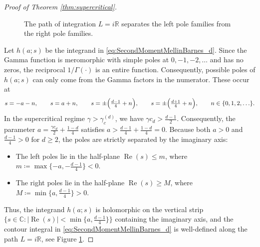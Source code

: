 \documentclass[11pt,a4paper]{article}
\theoremstyle{plain}
\theoremstyle{definition}
\theoremstyle{remark}
\def\CC{\mathbb{C}}
\def\RR{\mathbb{R}}
\begin{document}
\begin{proof}[Proof of Theorem \ref{thm:supercritical}]
\begin{figure}[t]
    \caption{The path of integration $L = i\RR$ separates the left pole families from the right pole families.}
    \label{fig:ContourGFunction}
\end{figure}

Let $h(a;s)$ be the integrand in \eqref{eq:SecondMomentMellinBarnes_d}. Since the Gamma function is meromorphic with simple poles at $0,-1,-2,\ldots$ and has no zeros, the reciprocal $1/\Gamma(\cdot)$ is an entire function. Consequently, possible poles of $h(a;s)$ can only come from the Gamma factors in the numerator. These occur at
\[
s=-a-n,\qquad s=a+n,\qquad s=\pm\Bigl(\tfrac{d-1}{4}+n\Bigr),\qquad s=\pm\Bigl(\tfrac{d+1}{4}+n\Bigr),
\qquad n\in\{0,1,2,\ldots\}.
\]
In the supercritical regime $\gamma>\gamma_c^{(d)}$, we have $\gamma c_d > \frac{d-1}{2}$. Consequently, the parameter $a = \frac{\gamma c_d}{2} + \frac{1-d}{4}$ satisfies $a > \frac{d-1}{4} + \frac{1-d}{4} = 0$. Because both $a > 0$ and $\frac{d-1}{4} > 0$ for $d \ge 2$, the poles are strictly separated by the imaginary axis:
\begin{itemize}
	\item The left poles lie in the half-plane $\operatorname{Re}(s)\le m$, where
	$m\coloneqq\max\{-a,-\tfrac{d-1}{4}\}<0$.
	\item The right poles lie in the half-plane $\operatorname{Re}(s)\ge M$, where
	$M\coloneqq\min\{a,\tfrac{d-1}{4}\}>0$.
\end{itemize}
Thus, the integrand $h(a;s)$ is holomorphic on the vertical strip $\{s\in\CC:|\operatorname{Re}(s)|<\min\{a,\frac{d-1}{4}\}\}$ containing the imaginary axis, and the contour integral in \eqref{eq:SecondMomentMellinBarnes_d} is well-defined along the path $L=i\RR$, see Figure \ref{fig:ContourGFunction}.


\end{proof}
\end{document}
